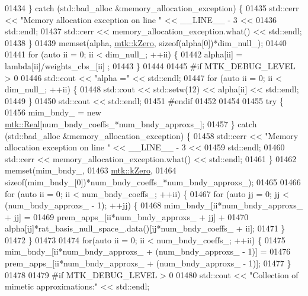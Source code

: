 \begin{DoxyCode}
{{01434   \} \textcolor{keywordflow}{catch} (std::bad\_alloc &memory\_allocation\_exception) \{
01435     std::cerr << \textcolor{stringliteral}{"Memory allocation exception on line "} << \_\_LINE\_\_ - 3 <<
01436       std::endl;
01437     std::cerr << memory\_allocation\_exception.what() << std::endl;
01438   \}
01439   memset(alpha, \hyperlink{group__c01-roots_ga59a451a5fae30d59649bcda274fea271}{mtk::kZero}, \textcolor{keyword}{sizeof}(alpha[0])*dim\_null\_);
01440 
01441   \textcolor{keywordflow}{for} (\textcolor{keyword}{auto} ii = 0; ii < dim\_null\_; ++ii) \{
01442     alpha[ii] = lambda[ii]/weights\_cbs\_[ii] ;
01443   \}
01444 
01445 \textcolor{preprocessor}{  #if MTK\_DEBUG\_LEVEL > 0}
01446   std::cout << \textcolor{stringliteral}{"alpha ="} << std::endl;
01447   \textcolor{keywordflow}{for} (\textcolor{keyword}{auto} ii = 0; ii < dim\_null\_; ++ii) \{
01448     std::cout << std::setw(12) << alpha[ii] << std::endl;
01449   \}
01450   std::cout << std::endl;
01451 \textcolor{preprocessor}{  #endif}
01452 
01454 
01455   \textcolor{keywordflow}{try} \{
01456     mim\_bndy\_ = \textcolor{keyword}{new} \hyperlink{group__c01-roots_gac080bbbf5cbb5502c9f00405f894857d}{mtk::Real}[num\_bndy\_coeffs\_*num\_bndy\_approxs\_];
01457   \} \textcolor{keywordflow}{catch} (std::bad\_alloc &memory\_allocation\_exception) \{
01458     std::cerr << \textcolor{stringliteral}{"Memory allocation exception on line "} << \_\_LINE\_\_ - 3 <<
01459       std::endl;
01460     std::cerr << memory\_allocation\_exception.what() << std::endl;
01461   \}
01462   memset(mim\_bndy\_,
01463          \hyperlink{group__c01-roots_ga59a451a5fae30d59649bcda274fea271}{mtk::kZero},
01464          \textcolor{keyword}{sizeof}(mim\_bndy\_[0])*num\_bndy\_coeffs\_*num\_bndy\_approxs\_);
01465 
01466   \textcolor{keywordflow}{for} (\textcolor{keyword}{auto} ii = 0; ii < num\_bndy\_coeffs\_; ++ii) \{
01467     \textcolor{keywordflow}{for} (\textcolor{keyword}{auto} jj = 0; jj < (num\_bndy\_approxs\_ - 1); ++jj) \{
01468       mim\_bndy\_[ii*num\_bndy\_approxs\_ + jj] =
01469         prem\_apps\_[ii*num\_bndy\_approxs\_ + jj] +
01470         alpha[jj]*rat\_basis\_null\_space\_.data()[jj*num\_bndy\_coeffs\_ + ii];
01471     \}
01472   \}
01473 
01474   \textcolor{keywordflow}{for}(\textcolor{keyword}{auto} ii = 0; ii < num\_bndy\_coeffs\_; ++ii) \{
01475     mim\_bndy\_[ii*num\_bndy\_approxs\_ + (num\_bndy\_approxs\_ - 1)] =
01476       prem\_apps\_[ii*num\_bndy\_approxs\_ + (num\_bndy\_approxs\_ - 1)];
01477   \}
01478 
01479 \textcolor{preprocessor}{  #if MTK\_DEBUG\_LEVEL > 0}
01480   std::cout << \textcolor{stringliteral}{"Collection of mimetic approximations:"} << std::endl;
}}
\end{DoxyCode}

